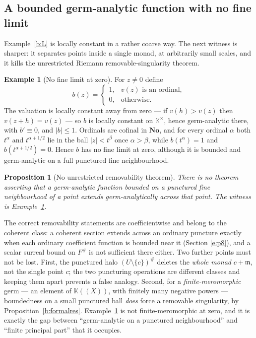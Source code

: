 \documentclass[11pt,a4paper]{article}
\numberwithin{equation}{section}
\newtheorem{proposition}[theorem]{Proposition}
\theoremstyle{definition}
\newtheorem{example}[theorem]{Example}
\theoremstyle{remark}
\theoremstyle{plain}
\newcommand{\K}{\mathbb K}
\newcommand{\No}{\mathbf{No}}
\newcommand{\mm}{\mathfrak m}
\newcommand{\tm}{t}
\newcommand{\halo}[1]{#1^{\#}}
\newcommand{\ev}[1]{#1^{\#}}
\newcommand{\abs}[1]{\lvert #1\rvert}
\begin{document}
\subsection{A bounded germ-analytic function with no fine limit}

Example~\ref{b:L} is locally constant in a rather coarse way. The next
witness is sharper: it separates points inside a single monad, at
arbitrarily small scales, and it kills the unrestricted Riemann
removable-singularity theorem.

\begin{example}[No fine limit at zero]
\label{b:ordinalindicator}
For $z\ne0$ define
\[
 b(z)=\begin{cases}
 1,&v(z)\text{ is an ordinal},\\[2pt]
 0,&\text{otherwise}.
 \end{cases}
\]
The valuation is locally constant away from zero --- if
$v(h)>v(z)$ then $v(z+h)=v(z)$ --- so $b$ is locally constant on
$\K^{\times}$, hence germ-analytic there, with $b'\equiv0$, and
$\abs b\le1$. Ordinals are cofinal in $\No$, and for every ordinal
$\alpha$ both $\tm^{\alpha}$ and $\tm^{\alpha+1/2}$ lie in the ball
$\abs z<\tm^{\beta}$ once $\alpha>\beta$, while
$b(\tm^{\alpha})=1$ and $b(\tm^{\alpha+1/2})=0$. Hence $b$ has no fine
limit at zero, although it is bounded and germ-analytic on a full
punctured fine neighbourhood.
\end{example}

\begin{proposition}[No unrestricted removability theorem]
\label{b:noremoval}
There is no theorem asserting that a germ-analytic function bounded on a
punctured fine neighbourhood of a point extends germ-analytically across
that point. The witness is Example~\ref{b:ordinalindicator}.
\end{proposition}

The correct removability statements are coefficientwise and belong to the
coherent class: a coherent section extends across an ordinary puncture
exactly when each ordinary coefficient function is bounded near it
(Section \ref{e:p8}), and a scalar surreal bound on $\ev F$ is not
sufficient there either. Two further points must not be lost. First,
the punctured halo $\halo{(U\setminus\{c\})}$ deletes the \emph{whole
monad} $c+\mm$, not the single point $c$; the two puncturing operations
are different classes and keeping them apart prevents a false analogy.
Second, for a \emph{finite-meromorphic} germ --- an element of $\K((X))$,
with finitely many negative powers --- boundedness on a small punctured
ball \emph{does} force a removable singularity, by
Proposition~\ref{b:formalres}. Example~\ref{b:ordinalindicator} is not
finite-meromorphic at zero, and it is exactly the gap between ``germ-analytic
on a punctured neighbourhood'' and ``finite principal part'' that it
occupies.
\end{document}
